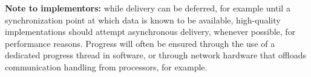 \textbf{Note to implementors:} while delivery can be deferred, for example until a synchronization point at which data is known to be available, high-quality implementations should attempt asynchronous delivery, whenever possible, for performance reasons. Progress will often be ensured through the use of a dedicated progress thread in software, or through network hardware that offloads communication handling from processors, for example.





